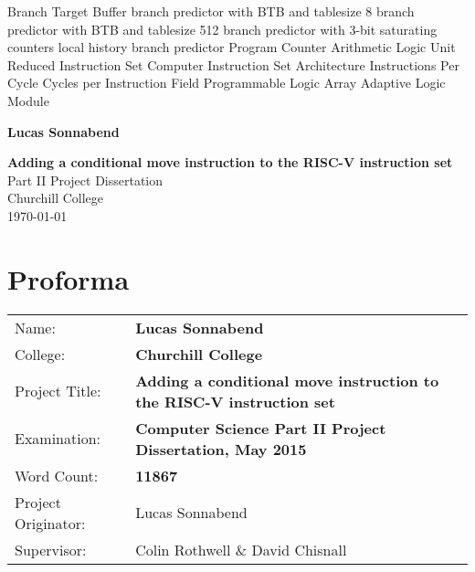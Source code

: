 \documentclass[12pt,twoside,notitlepage]{report}
\begin{document}
 {Branch Target Buffer}
 {branch predictor with BTB and tablesize 8}
 {branch predictor with BTB and tablesize 512}
 {branch predictor with 3-bit saturating counters}
 {local history branch predictor}
 {Program Counter}
 {Arithmetic Logic Unit}
 {Reduced Instruction Set Computer}
 {Instruction Set Architecture}
 {Instructions Per Cycle}
 {Cycles per Instruction}
 {Field Programmable Logic Array}
 {Adaptive Logic Module}

%



\pagestyle{empty}

\hfill{\LARGE \bf Lucas Sonnabend}

\vspace*{60mm}
\begin{center}
\Huge
{\bf Adding a conditional move instruction to the RISC-V instruction set} \\
\vspace*{5mm}
Part II Project Dissertation \\
\vspace*{5mm}
Churchill College \\
\vspace*{5mm}
\today  %
\end{center}

\cleardoublepage


\setcounter{page}{1}
\pagestyle{plain}

\chapter*{Proforma}

{\large
\begin{tabularx}{\textwidth}{l X}
Name:               & \bf Lucas Sonnabend                       \\
College:            & \bf Churchill College                     \\
Project Title:      & \bf Adding a conditional move instruction to the RISC-V instruction set \\
Examination:        & \bf Computer Science Part II Project Dissertation, May 2015        \\
Word Count:         & \bf 11867\footnotemark[1]\\
Project Originator: & Lucas Sonnabend              \\
Supervisor:         & Colin Rothwell \& David Chisnall       \\ 
\end{tabularx}
}
\end{document}
